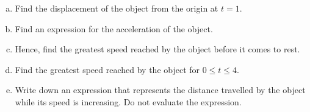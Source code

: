 \documentclass[12pt, twoside]{article}
\begin{document}
\begin{enumerate}
    \begin{enumerate}[(a)]
        \item Find the displacement of the object from the origin at $t = 1$.
        \item Find an expression for the acceleration of the object.
        \item Hence, find the greatest speed reached by the object before it comes to rest.
        \item Find the greatest speed reached by the object for $0 \leq t \leq 4$.
        \item Write down an expression that represents the distance travelled by the object while its speed is increasing. Do not evaluate the expression.
    \end{enumerate}

\end{enumerate}
\end{document}
